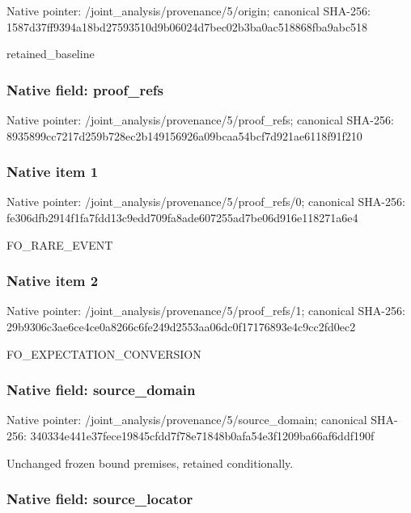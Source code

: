 \documentclass[10pt,a4paper]{article}
\begin{document}
Native pointer: /joint\_analysis/provenance/5/origin; canonical SHA-256: 1587d37ff9394a18bd275935\allowbreak{}10d9b06024d7bec02b3ba0ac\allowbreak{}518868fba9abc518


retained\_baseline


\subsubsection{Native field: proof\_refs}


Native pointer: /joint\_analysis/provenance/5/proof\_refs; canonical SHA-256: 8935899cc7217d259b728ec2\allowbreak{}b149156926a09bcaa54bcf7d\allowbreak{}921ae6118f91f210



\subsubsection{Native item 1}


Native pointer: /joint\_analysis/provenan\allowbreak{}ce/5/proof\_refs/0; canonical SHA-256: fe306dfb2914f1fa7fdd13c9\allowbreak{}edd709fa8ade607255ad7be0\allowbreak{}6d916e118271a6e4


FO\_RARE\_EVENT


\subsubsection{Native item 2}


Native pointer: /joint\_analysis/provenan\allowbreak{}ce/5/proof\_refs/1; canonical SHA-256: 29b9306c3ae6ce4ce0a8266c\allowbreak{}6fe249d2553aa06dc0f17176\allowbreak{}893e4c9cc2fd0ec2


FO\_EXPECTATION\_CONVERSION


\subsubsection{Native field: source\_domain}


Native pointer: /joint\_analysis/provenan\allowbreak{}ce/5/source\_domain; canonical SHA-256: 340334e441e37fece19845cf\allowbreak{}dd7f78e71848b0afa54e3f12\allowbreak{}09ba66af6ddf190f


Unchanged frozen bound premises, retained conditionally.


\subsubsection{Native field: source\_locator}
\end{document}
